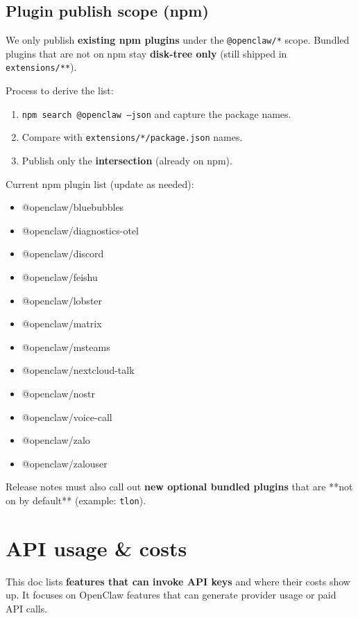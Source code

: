 \subsection{Plugin publish scope (npm)}


We only publish \textbf{existing npm plugins} under the \texttt{@openclaw/*} scope. Bundled
plugins that are not on npm stay \textbf{disk-tree only} (still shipped in
\texttt{extensions/**}).

Process to derive the list:

\begin{enumerate}
  \item \texttt{npm search @openclaw --json} and capture the package names.
  \item Compare with \texttt{extensions/*/package.json} names.
  \item Publish only the \textbf{intersection} (already on npm).
\end{enumerate}


Current npm plugin list (update as needed):

\begin{itemize}
  \item @openclaw/bluebubbles
  \item @openclaw/diagnostics-otel
  \item @openclaw/discord
  \item @openclaw/feishu
  \item @openclaw/lobster
  \item @openclaw/matrix
  \item @openclaw/msteams
  \item @openclaw/nextcloud-talk
  \item @openclaw/nostr
  \item @openclaw/voice-call
  \item @openclaw/zalo
  \item @openclaw/zalouser
\end{itemize}


Release notes must also call out \textbf{new optional bundled plugins} that are **not
on by default** (example: \texttt{tlon}).


\clearpage

\section{API usage \& costs}


This doc lists \textbf{features that can invoke API keys} and where their costs show up. It focuses on
OpenClaw features that can generate provider usage or paid API calls.

